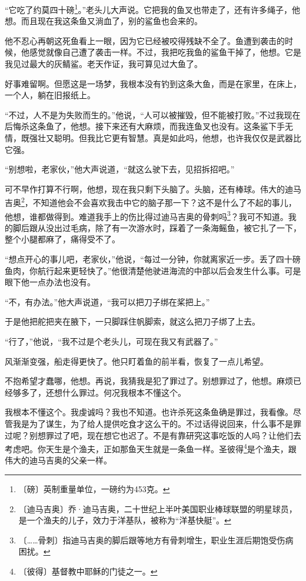 \documentclass[12pt,UTF-8,openany]{ctexbook}
\begin{document}
\begin{normalsize}
    “它吃了约莫四十磅\footnote{〔磅〕英制重量单位，一磅约为453克。}。”老头儿大声说。它把我的鱼叉也带走了，还有许多绳子，他想。而且现在我这条鱼又淌血了，别的鲨鱼也会来的。
    
    他不忍心再朝这死鱼看上一眼，因为它已经被咬得残缺不全了。鱼遭到袭击的时候，他感觉就像自己遭了袭击一样。不过，我把吃我鱼的鲨鱼干掉了，他想。它是我见过最大的灰鲭鲨。老天作证，我可算见过大鱼了。
    
    好事难留啊。但愿这是一场梦，我根本没有钓到这条大鱼，而是在家里，在床上，一个人，躺在旧报纸上。
    
    “不过，人不是为失败而生的。”他说，“人可以被摧毁，但不能被打败。”不过我现在后悔杀这条鱼了，他想。接下来还有大麻烦，而我连鱼叉也没有。这条鲨下手无情，既强壮又聪明。但我比它更有智慧。真是如此吗，他想，也许我仅仅是武器比它强。
    
    “别想啦，老家伙，”他大声说道，“就这么驶下去，见招拆招吧。”
    
    可不早作打算不行啊，他想，现在我只剩下头脑了。头脑，还有棒球。伟大的迪马吉奥\footnote{〔迪马吉奥〕乔·迪马吉奥，二十世纪上半叶美国职业棒球联盟的明星球员，是一个渔夫的儿子，效力于洋基队，被称为“洋基快艇”。}，不知道他会不会喜欢我击中它的脑子那一下？这不是什么了不起的事儿，他想，谁都做得到。难道我手上的伤比得过迪马吉奥的骨刺吗\footnote{〔……骨刺〕指迪马吉奥的脚后跟等地方有骨刺增生，职业生涯后期饱受伤病困扰。}？我可不知道。我的脚后跟从没出过毛病，除了有一次游水时，踩着了一条海鳐鱼，被它扎了一下，整个小腿都麻了，痛得受不了。
    
    “想点开心的事儿吧，老家伙，”他说，“每过一分钟，你就离家近一步。丢了四十磅鱼肉，你航行起来更轻快了。”他很清楚他驶进海流的中部以后会发生什么事。可是眼下他一点办法也没有。
    
    “不，有办法。”他大声说道，“我可以把刀子绑在桨把上。”
    
    于是他把舵把夹在腋下，一只脚踩住帆脚索，就这么把刀子绑了上去。
    
    “行了，”他说，“我不过是个老头儿，可现在我又有武器了。”
    
    风渐渐变强，船走得更快了。他只盯着鱼的前半看，恢复了一点儿希望。
    
    不抱希望才蠢哪，他想。再说，我猜我是犯了罪过了。别想罪过了，他想。麻烦已经够多了，还想什么罪过。何况我根本不懂这个。
    
    我根本不懂这个。我虔诚吗？我也不知道。也许杀死这条鱼确是罪过，我看像。尽管我是为了谋生，为了给人提供吃食才这么干的。不过话得说回来，什么事不是罪过呢？别想罪过了吧，现在想它也迟了。不是有靠研究这事吃饭的人吗？让他们去考虑吧。你天生是个渔夫，正如那鱼天生就是一条鱼一样。圣彼得\footnote{〔彼得〕基督教中耶稣的门徒之一。}是个渔夫，跟伟大的迪马吉奥的父亲一样。
    

\end{normalsize}
\end{document}

